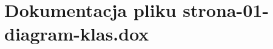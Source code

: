 \hypertarget{strona-01-diagram-klas_8dox}{
\section{Dokumentacja pliku strona-\/01-\/diagram-\/klas.dox}
\label{strona-01-diagram-klas_8dox}
}
